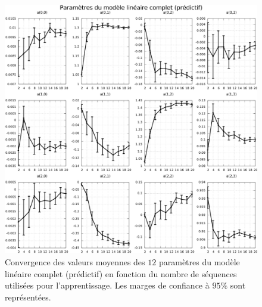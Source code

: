 \begin{figure}[htb]
    \centerfloat
    \includegraphics[type=pdf,ext=.pdf,read=.pdf,width=0.9\linewidth]{../plot/OdometryCMAES/parametersFullOrders}
    \caption{\label{fig:odometry_cmaes_parameters_full_orders} 
        Convergence des valeurs moyennes des $12$ paramètres du modèle linéaire complet (prédictif)
        en fonction du nombre de séquences utilisées pour l'apprentissage.
        Les marges de confiance à $95\%$ sont représentées.
    }
\end{figure}

